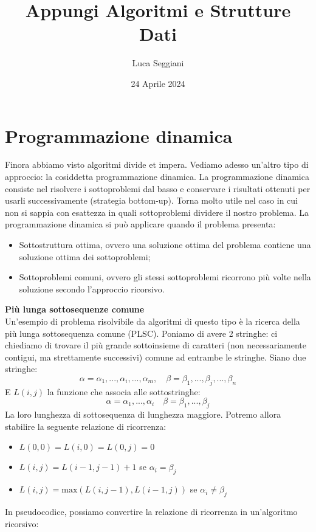 \documentclass[a4paper,12pt]{article}
\title{Appungi Algoritmi e Strutture Dati}
\author{Luca Seggiani}
\date{24 Aprile 2024}
\begin{document}
\maketitle
\section{Programmazione dinamica}
Finora abbiamo visto algoritmi divide et impera. Vediamo adesso un'altro tipo di approccio: la cosiddetta programmazione dinamica. La programmazione dinamica consiste
nel risolvere i sottoproblemi dal basso e conservare i risultati ottenuti per usarli successivamente (strategia bottom-up). Torna molto utile nel caso in cui non si sappia con esattezza
in quali sottoproblemi dividere il nostro problema. La programmazione dinamica si può applicare quando il problema presenta:
\begin{itemize}
  \item Sottostruttura ottima, ovvero una soluzione ottima del problema contiene una soluzione ottima dei sottoproblemi;
  \item Sottoproblemi comuni, ovvero gli stessi sottoproblemi ricorrono più volte nella soluzione secondo l'approccio ricorsivo.
\end{itemize}
\par\smallskip
\textbf{Più lunga sottosequenze comune} \\
Un'esempio di problema risolvibile da algoritmi di questo tipo è la ricerca della più lunga sottosequenza comune (PLSC). Poniamo di avere 2 stringhe: ci chiediamo
di trovare il più grande sottoinsieme di caratteri (non necessariamente contigui, ma strettamente successivi) comune ad entrambe le stringhe. 
Siano due stringhe:
$$ \alpha = \alpha_1, ..., \alpha_i, ... , \alpha_m, \quad \beta = \beta_1, ..., \beta_j, ... , \beta_n $$
E $L(i,j)$ la funzione che associa alle sottostringhe:
$$ \alpha = \alpha_1, ..., \alpha_i \quad \beta = \beta_1, ..., \beta_j $$
La loro lunghezza di sottosequenza di lunghezza maggiore. Potremo allora stabilire la seguente relazione di ricorrenza:
\begin{itemize}
  \item $L(0,0) = L(i, 0) = L(0,j) = 0$
  \item $L(i, j) = L(i -1, j -1) + 1$ se $\alpha_i = \beta_j$
  \item $L(i, j) = \mathrm{max}(L(i, j -1), L(i -1, j))$ se $\alpha_i \neq \beta_j$
\end{itemize}
In pseudocodice, possiamo convertire la relazione di ricorrenza in un'algoritmo ricorsivo:
\end{document}
